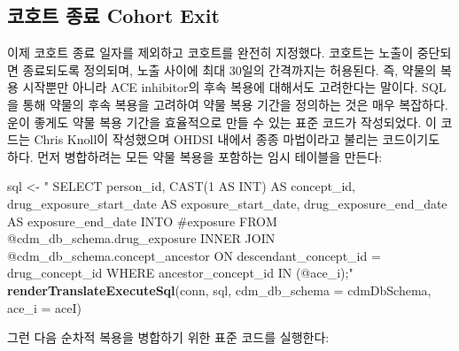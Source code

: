 \documentclass[10.5pt]{book}
\newenvironment{Shaded}{\begin{snugshade}}{\end{snugshade}}
\newcommand{\KeywordTok}[1]{\textcolor[rgb]{0.13,0.29,0.53}{\textbf{#1}}}
\newcommand{\DataTypeTok}[1]{\textcolor[rgb]{0.13,0.29,0.53}{#1}}
\newcommand{\StringTok}[1]{\textcolor[rgb]{0.31,0.60,0.02}{#1}}
\newcommand{\NormalTok}[1]{#1}
\theoremstyle{definition}
\theoremstyle{definition}
\theoremstyle{definition}
\theoremstyle{remark}
\begin{document}
\subsection{코호트 종료 Cohort Exit}\label{--cohort-exit}

이제 코호트 종료 일자를 제외하고 코호트를 완전히 지정했다. 코호트는
노출이 중단되면 종료되도록 정의되며, 노출 사이에 최대 30일의 간격까지는
허용된다. 즉, 약물의 복용 시작뿐만 아니라 ACE inhibitor의 후속 복용에
대해서도 고려한다는 말이다. SQL을 통해 약물의 후속 복용을 고려하여 약물
복용 기간을 정의하는 것은 매우 복잡하다. 운이 좋게도 약물 복용 기간을
효율적으로 만들 수 있는 표준 코드가 작성되었다. 이 코드는 Chris Knoll이
작성했으며 OHDSI 내에서 종종 마법이라고 불리는 코드이기도 하다. 먼저
병합하려는 모든 약물 복용을 포함하는 임시 테이블을 만든다:

\begin{Shaded}
\begin{Highlighting}[]
\NormalTok{sql <-}\StringTok{ "}
\StringTok{  SELECT person_id,}
\StringTok{    CAST(1 AS INT) AS concept_id,}
\StringTok{    drug_exposure_start_date AS exposure_start_date,}
\StringTok{    drug_exposure_end_date AS exposure_end_date}
\StringTok{  INTO #exposure}
\StringTok{  FROM @cdm_db_schema.drug_exposure}
\StringTok{  INNER JOIN @cdm_db_schema.concept_ancestor}
\StringTok{    ON descendant_concept_id = drug_concept_id}
\StringTok{  WHERE ancestor_concept_id IN (@ace_i);"}
\KeywordTok{renderTranslateExecuteSql}\NormalTok{(conn,}
\NormalTok{                          sql,}
                          \DataTypeTok{cdm_db_schema =}\NormalTok{ cdmDbSchema,}
                          \DataTypeTok{ace_i =}\NormalTok{ aceI)}
\end{Highlighting}
\end{Shaded}

그런 다음 순차적 복용을 병합하기 위한 표준 코드를 실행한다:
\end{document}
